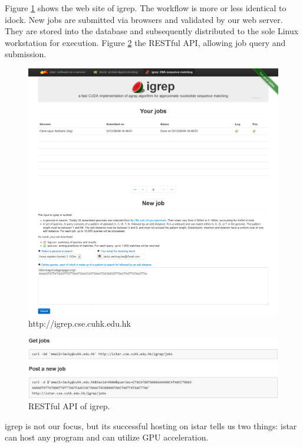Figure \ref{istar:igrep} shows the web site of igrep. The workflow is more or less identical to idock. New jobs are submitted via browsers and validated by our web server. They are stored into the database and subsequently distributed to the sole Linux workstation for execution. Figure \ref{istar:igrep-rest} the RESTful API, allowing job query and submission.

\begin{figure}
\centering
\includegraphics[width=\linewidth]{istar/igrep.png}
\caption{http://igrep.cse.cuhk.edu.hk}
\label{istar:igrep}
\end{figure}

\begin{figure}
\centering
\includegraphics[width=\linewidth]{istar/igrep-rest.png}
\caption{RESTful API of igrep.}
\label{istar:igrep-rest}
\end{figure}

igrep is not our focus, but its successful hosting on istar tells us two things: istar can host any program and can utilize GPU acceleration.

\chapterend

